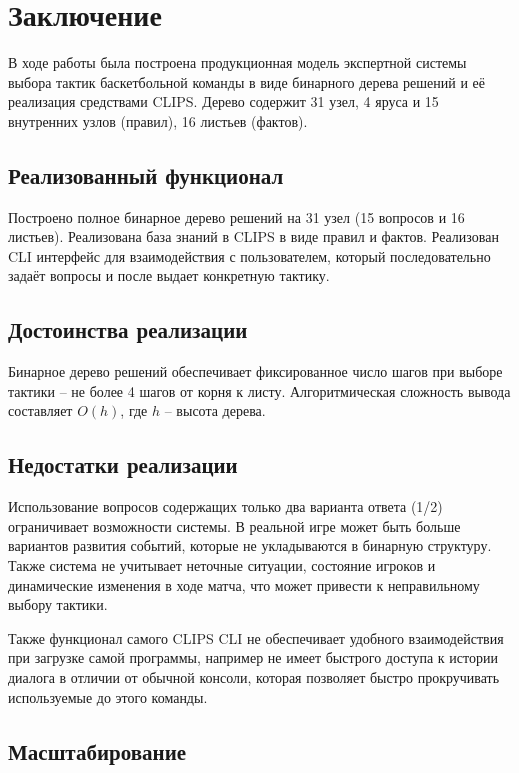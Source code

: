 \documentclass[a4paper, final]{article}
\begin{document}
\section*{Заключение}

\justifying

В ходе работы была построена продукционная модель экспертной системы выбора тактик баскетбольной команды в виде бинарного дерева решений и её реализация средствами CLIPS. Дерево содержит
31 узел, 4 яруса и 15 внутренних узлов (правил), 16 листьев (фактов).


\subsection*{Реализованный функционал}

Построено полное бинарное дерево решений на 31 узел (15 вопросов и 16 листьев). Реализована база знаний в CLIPS в виде правил и фактов. Реализован CLI интерфейс  для взаимодействия с пользователем, который последовательно задаёт вопросы и после выдает конкретную тактику.

\subsection*{Достоинства реализации}

Бинарное дерево решений обеспечивает фиксированное число шагов при выборе тактики -- не более 4 шагов от корня к листу. Алгоритмическая сложность вывода составляет $O(h)$, где $h$ -- высота дерева.

\subsection*{Недостатки реализации}

Использование вопросов содержащих только два варианта ответа (1/2) ограничивает возможности системы. В реальной игре может быть больше вариантов развития событий, которые не укладываются в бинарную структуру. Также система не учитывает неточные ситуации, состояние игроков и динамические изменения в ходе матча, что может привести к неправильному выбору тактики. 

Также функционал самого CLIPS CLI не обеспечивает удобного взаимодействия при загрузке самой программы, например не имеет быстрого доступа к истории диалога в отличии от обычной консоли, которая позволяет быстро прокручивать используемые до этого команды.

\subsection*{Масштабирование}
\end{document}
